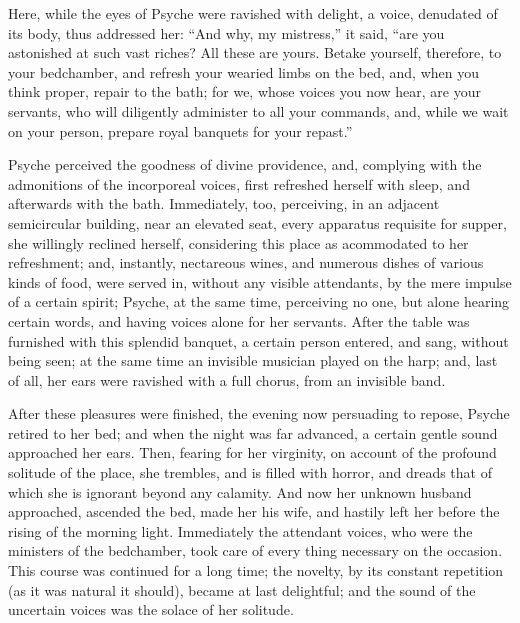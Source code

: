\documentclass[12pt]{article}
\begin{document}
Here, while the eyes of Psyche were ravished with delight, a voice, denudated
of its body, thus addressed her: ``And why, my mistress,'' it said, ``are you
astonished at such vast riches? All these are yours. Betake yourself,
therefore, to your bedchamber, and refresh your wearied limbs on the bed, and,
when you think proper, repair to the bath; for we, whose voices you now hear,
are your servants, who will diligently administer to all your commands, and,
while we wait on your person, prepare royal banquets for your repast.''

Psyche perceived the goodness of divine providence, and, complying with the
admonitions of the incorporeal voices, first refreshed herself with sleep, and
afterwards with the bath. Immediately, too, perceiving, in an adjacent
semicircular building, near an elevated seat, every apparatus requisite for
supper, she willingly reclined herself, considering this place as acommodated
to her refreshment; and, instantly, nectareous wines, and numerous dishes of
various kinds of food, were served in, without any visible attendants, by the
mere impulse of a certain spirit; Psyche, at the same time, perceiving no one,
but alone hearing certain words, and having voices alone for her servants.
After the table was furnished with this splendid banquet, a certain person
entered, and sang, without being seen; at the same time an invisible musician
played on the harp; and, last of all, her ears were ravished with a full
chorus, from an invisible band.

After these pleasures were finished, the evening now persuading to repose,
Psyche retired to her bed; and when the night was far advanced, a certain
gentle sound approached her ears. Then, fearing for her virginity, on account
of the profound solitude of the place, she trembles, and is filled with horror,
and dreads that of which she is ignorant beyond any calamity. And now her
unknown husband approached, ascended the bed, made her his wife, and hastily
left her before the rising of the morning light. Immediately the attendant
voices, who were the ministers of the bedchamber, took care of every thing
necessary on the occasion. This course was continued for a long time; the
novelty, by its constant repetition (as it was natural it should), became at
last delightful; and the sound of the uncertain voices was the solace of her
solitude.
\end{document}
